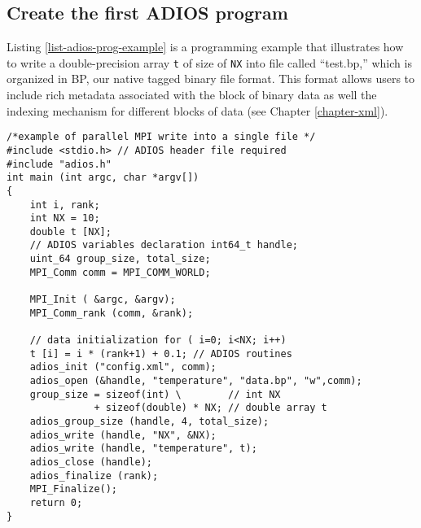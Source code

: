 \subsection{Create the first ADIOS program}

Listing \ref{list-adios-prog-example} is a programming example that illustrates 
how to write a double-precision 
array \verb+t+ of size of \verb+NX+ into file called ``test.bp,'' 
which is organized in BP, our native tagged binary file format. This format allows 
users to include rich metadata associated with the block of binary data as well 
the indexing mechanism for different blocks of data (see Chapter \ref{chapter-xml}). 

\begin{lstlisting}[alsolanguage=C,caption={ADIOS programming example.},label={list-adios-prog-example}]
/*example of parallel MPI write into a single file */ 
#include <stdio.h> // ADIOS header file required 
#include "adios.h"
int main (int argc, char *argv[])
{    
    int i, rank; 
    int NX = 10;
    double t [NX];
    // ADIOS variables declaration int64_t handle;
    uint_64 group_size, total_size;
    MPI_Comm comm = MPI_COMM_WORLD; 
    
    MPI_Init ( &argc, &argv);
    MPI_Comm_rank (comm, &rank);

    // data initialization for ( i=0; i<NX; i++)
    t [i] = i * (rank+1) + 0.1; // ADIOS routines 
    adios_init ("config.xml", comm);
    adios_open (&handle, "temperature", "data.bp", "w",comm); 
    group_size = sizeof(int) \        // int NX
               + sizeof(double) * NX; // double array t
    adios_group_size (handle, 4, total_size);
    adios_write (handle, "NX", &NX);
    adios_write (handle, "temperature", t); 
    adios_close (handle);
    adios_finalize (rank);
    MPI_Finalize(); 
    return 0;
}
\end{lstlisting}
